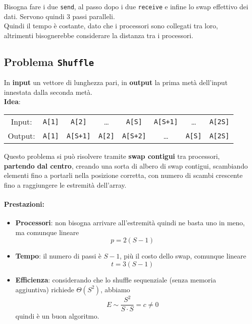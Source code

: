 Bisogna fare i due \texttt{send}, al passo dopo i due \texttt{receive} e infine lo swap effettivo dei dati. Servono quindi 3 passi paralleli.\\

Quindi il tempo è costante, dato che i processori sono collegati tra loro, altrimenti bisognerebbe considerare la distanza tra i processori.\\

\newpage

\subsection{Problema \texttt{Shuffle}}
\label{subsec:shuffle}

In \textbf{input} un vettore di lunghezza pari, in \textbf{output} la prima metà dell'input innestata dalla seconda metà.\\

\textbf{Idea}: 
\begin{center}
	\begin{tabular}{c c c c c c c c}
		Input: & \texttt{A[1]} & \texttt{A[2]} & \dots & \texttt{A[S]} & \texttt{A[S+1]} & \dots & \texttt{A[2S]} \\
		Output: & \texttt{A[1]} & \texttt{A[S+1]} & \texttt{A[2]} & \texttt{A[S+2]} & \dots & \texttt{A[S]} & \texttt{A[2S]} \\
	\end{tabular}
\end{center}

Questo problema si può risolvere tramite \textbf{swap contigui} tra processori, \textbf{partendo dal centro}, creando una sorta di albero di swap contigui, scambiando elementi fino a portarli nella posizione corretta, con numero di scambi crescente fino a raggiungere le estremità dell'array.\\

\paragraph{Prestazioni:}
\begin{itemize}
	\item \textbf{Processori}: non bisogna arrivare all'estremità quindi ne basta uno in meno, ma comunque lineare
	$$ p = 2(S-1)$$
	
	\item \textbf{Tempo}: il numero di passi è $S-1$, più il costo dello swap, comunque lineare
	$$ t = 3(S-1) $$
	
	\item \textbf{Efficienza}: considerando che lo shuffle sequenziale (senza memoria aggiuntiva) richiede $\Theta (S^2)$, abbiamo
	$$ E \sim \frac{S^2}{S \cdot S} = c \neq 0 $$ 
	quindi è un buon algoritmo.\\
\end{itemize}

